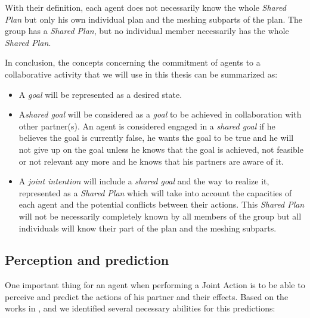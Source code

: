\documentclass[english,a4paper,11pt,twoside]{StyleThese}
\begin{document}
With their definition, each agent does not necessarily know the whole \textit{Shared Plan} but only his own individual plan and the meshing subparts of the plan. The group has a \textit{Shared Plan}, but no individual member necessarily has the whole \textit{Shared Plan}.

In conclusion, the concepts concerning the commitment of agents to a collaborative activity that we will use in this thesis can be summarized as:
\begin{itemize}
\item A \textit{goal} will be represented as a desired state.
\item A\textit{shared goal} will be considered as a \textit{goal} to be achieved in collaboration with other partner(s). An agent is considered engaged in a \textit{shared goal} if he believes the goal is currently false, he wants the goal to be true and he will not give up on the goal unless he knows that the goal is achieved, not feasible or not relevant any more and he knows that his partners are aware of it.
\item A \textit{joint intention} will include a \textit{shared goal} and the way to realize it, represented as a \textit{Shared Plan} which will take into account the capacities of each agent and the potential conflicts between their actions. This \textit{Shared Plan} will not be necessarily completely known by all members of the group but all individuals will know their part of the plan and the meshing subparts.
\end{itemize}


\subsection{Perception and prediction}

\label{subsec:prediction}

One important thing for an agent when performing a Joint Action is to be able to perceive and predict the actions of his partner and their effects. Based on the works in \cite{sebanz2006joint}, \cite{pacherie2011phenomenology} and \cite{obhi2011moving} we identified several necessary abilities for this predictions:
\end{document}
